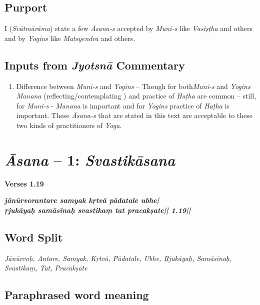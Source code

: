 \subsection*{Purport}

I (\textit{Svātmārāma}) state a few \textit{Āsana-s} accepted by \textit{Muni-s} like \textit{Vasiṣṭha} and others and by \textit{Yogins} like \textit{Matsyendra} and others.  

\subsection*{Inputs from \textit{Jyotsnā} Commentary}

\begin{enumerate}
\item Difference between \textit{Muni-s} and \textit{Yogins} – Though for both\break \textit{Muni-s} and \textit{Yogins} \textit{Manana} (reflecting/contemplating ) and practice of \textit{Haṭha} are common – still, for  \textit{Muni-s} - \textit{Manana} is important and for \textit{Yogins} practice of \textit{Haṭha} is important. These \textit{Āsana-s} that are stated in this text are acceptable to these two kinds of practitioners of \textit{Yoga}.
\end{enumerate}

\section*{\textit{Āsana} -- 1: \textit{Svastikāsana}}

\noindent \textbf{Verses 1.19}

\begin{shloka}
\textit{\textbf{jānūrvorantare samyak kṛtvā pādatale ubhe|}\\
\textbf{ṛjukāyaḥ samāsīnaḥ svastikaṃ tat pracakṣate|| 1.19||}}
\end{shloka}

\subsection*{Word Split}

\textit{Jānūrvoḥ, Antare, Samyak, Kṛtvā, Pādatale, Ubhe, Ṛjukāyaḥ, Samāsīnaḥ, Svastikaṃ, Tat, Pracakṣate}

\vspace{-5pt}

\subsection*{Paraphrased word meaning}
\vspace{-10pt}

